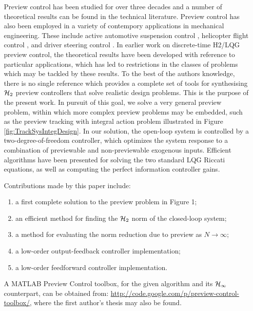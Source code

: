 Preview control has been studied for over three decades and a number of theoretical results can be found in the technical literature. Preview control has also been employed in a variety of contempory applications in mechanical engineering. These include active automotive suspension control \cite{Roh_1999_Stoc_Opt_Prev,Marzbanrad_2004_SuspPrev}, helicopter flight control \cite{Paulino_2006_PreviewRotorcraftAffine}, 
and driver steering control \cite{Cole_2006_PredictiveAndPreviewSteeringControl}. In earlier work on discrete-time H2/LQG preview control, the theoretical results have been developed with reference to particular applications, which has led to restrictions in the classes of problems which may be tackled by these results. To the best of the authors knowledge, there is no single reference which provides a complete set of tools for synthesising $\mathcal H_2$ preview controllers that solve realistic design problems. This is the purpose of the present work. In pursuit of this goal, we solve a very general preview problem, within which more complex preview problems may be embedded, such as the preview tracking with integral action problem illustrated in Figure \ref{fig:TrackSysIntegDesign}.
In our solution, the open-loop system is controlled by a two-degree-of-freedom controller, which optimizes the system response to a combination of previewable and non-previewable exogenous inputs. Efficient algorithms have been presented for solving the two standard LQG Riccati equations, as well as computing the perfect information controller gains.

Contributions made by this paper include:
\begin{enumerate}
\item a first complete solution to the preview problem in Figure 1;
\item an efficient method for finding the $\mathcal H_2$ norm of the closed-loop system;
\item a method for evaluating the norm reduction due to preview as $N \rightarrow \infty$;
\item a low-order output-feedback controller implementation;
\item a low-order feedforward controller implementation.
\end{enumerate}

A MATLAB Preview Control toolbox, for the given algorithm and its $\mathcal H_\infty$ counterpart, can be obtained from: %
\url{http://code.google.com/p/preview-control-toolbox/}, where the first author's thesis may also be found.